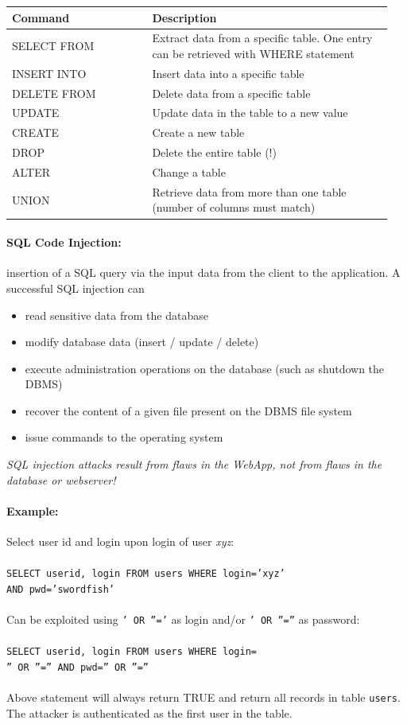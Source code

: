 \begin{tabular}{p{0.35\linewidth}p{0.6\linewidth}}
Command & Description \\
\hline
\hline
SELECT FROM & Extract data from a specific table. One entry can be retrieved with WHERE statement \\
INSERT INTO & Insert data into a specific table \\
DELETE FROM & Delete data from a specific table\\
UPDATE & Update data in the table to a new value \\
CREATE & Create a new table\\
DROP & Delete the entire table (!) \\
ALTER & Change a table \\
UNION & Retrieve data from more than one table (number of columns must match) \\
\end{tabular}

\paragraph{SQL Code Injection:} insertion of a SQL query via the input data from the client to the application. A successful SQL injection can
\begin{itemize}
\item read sensitive data from the database
\item modify database data (insert / update / delete)
\item execute administration operations on the database
(such as shutdown the DBMS)
\item recover the content of a given file present on the DBMS file
system
\item issue commands to the operating system
\end{itemize}
\emph{SQL injection attacks result from flaws in the WebApp, not from flaws in the database or webserver!}

\paragraph{Example:} Select user id and login upon login of user \emph{xyz}: \\
\\
{\tt SELECT userid, login FROM users WHERE login='xyz'}\\ {\tt AND pwd='swordfish'} \\
\\
Can be exploited using {\tt ' OR ''='} as login and/or {\tt ' OR ''=''} as password:\\
\\
{\tt SELECT userid, login FROM users WHERE login=} \\ {\tt '' OR ''='' AND pwd='' OR ''=''} \\
\\
Above statement will always return TRUE and return all records in table {\tt users}. The attacker is authenticated as the first user in the table.

